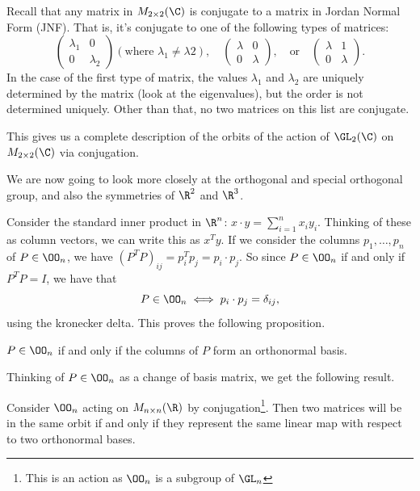 \begin{example}
Recall that any matrix in $M_{2 \times 2}(\C)$ is conjugate to a matrix in Jordan Normal Form (JNF). That is, it's conjugate to one of the following types of matrices:
$$
\begin{pmatrix}
	\lambda_1 & 0 \\ 0 & \lambda_2
\end{pmatrix} (\text{where }\lambda_1 \neq \lambda 2), \quad \begin{pmatrix}
	\lambda & 0 \\ 0 & \lambda
\end{pmatrix}, \quad \text{or} \quad \begin{pmatrix}
	\lambda & 1 \\ 0 & \lambda
\end{pmatrix}.
$$
In the case of the first type of matrix, the values $\lambda_1$ and $\lambda_2$ are uniquely determined by the matrix (look at the eigenvalues), but the order is not determined uniquely. Other than that, no two matrices on this list are conjugate.

This gives us a complete description of the orbits of the action of $\GL_2(\C)$ on $M_{2 \times 2}(\C)$ via conjugation.
\end{example}


We are now going to look more closely at the orthogonal and special orthogonal group, and also the symmetries of $\R^2$ and $\R^3$.

Consider the standard inner product in $\R^n$: $x \cdot y = \sum_{i = 1}^n x_i y_i$. Thinking of these as column vectors, we can write this as $x^T y$. If we consider the columns $p_1, \dots, p_n$ of $P \in \OO_n$, we have $(P^T P)_{ij} = p_i^T p_j = p_i \cdot p_j$. So since $P \in \OO_n$ if and only if $P^T P = I$, we have that
$$
P \in \OO_n \iff p_i \cdot p_j = \delta_{ij},
$$
using the kronecker delta. 
This proves the following proposition.

\begin{proposition}
	$P \in \OO_n$ if and only if the columns of $P$ form an orthonormal basis.
\end{proposition}

Thinking of $P \in \OO_n$ as a change of basis matrix, we get the following result.

\begin{proposition}
	Consider $\OO_n$ acting on $M_{n \times n}(\R)$ by conjugation\footnote{This is an action as $\OO_n$ is a subgroup of $\GL_n$}. Then two matrices will be in the same orbit if and only if they represent the same linear map with respect to two orthonormal bases.
\end{proposition}


